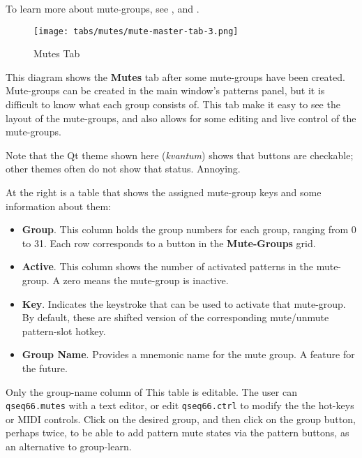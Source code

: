    To learn more about mute-groups, see
   , and
   .

\begin{figure}[H]
   \centering 
   \texttt{[image: tabs/mutes/mute-master-tab-3.png]}
   \caption{Mutes Tab}
   \label{fig:mutes_master_tab}
\end{figure}

   This diagram shows the \textbf{Mutes} tab after some mute-groups have been
   created.  Mute-groups can be created in the main window's patterns panel,
   but it is difficult to know what each group consists of.  This tab make it
   easy to see the layout of the mute-groups, and also allows for some editing
   and live control of the mute-groups.

   Note that the Qt theme shown here (\textsl{kvantum})
   shows that buttons are checkable; other themes often do not show that status.
   Annoying.

   \setcounter{ItemCounter}{0}      %

   At the right is a table that shows the assigned mute-group keys and
   some information about them:

      \begin{itemize}
         \item \textbf{Group}.
            This column holds the group numbers for each group, ranging from 0
            to 31.  Each row corresponds to a button in the
            \textbf{Mute-Groups} grid.
         \item \textbf{Active}.
            This column shows the number of activated patterns in the
            mute-group.  A zero means the mute-group is inactive.
         \item \textbf{Key}.
            Indicates the keystroke that can be used to activate that
            mute-group.
            By default, these are shifted version of the corresponding
            mute/unmute pattern-slot hotkey.
         \item \textbf{Group Name}.
            Provides a mnemonic name for the mute group.  A feature for the
            future.
      \end{itemize}

   Only the group-name column of This table is editable.
   The user can \texttt{qseq66.mutes} with a text editor, or
   edit \texttt{qseq66.ctrl} to modify the the hot-keys or MIDI
   controls.
   Click on the desired group, and then click on the group button, perhaps
   twice, to be able to add pattern mute states via the pattern buttons,
   as an alternative to group-learn.

